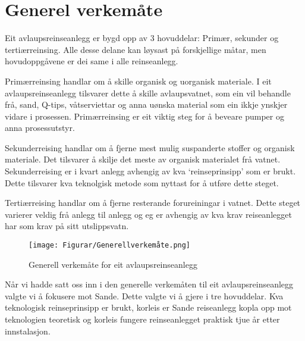 \section{Generel verkemåte}

Eit avlaupsreinseanlegg er bygd opp av 3 hovuddelar: Primær, sekunder og tertiærreinsing.
Alle desse delane kan løysast på forskjellige måtar, men hovudoppgåvene er dei same
i alle reinseanlegg.

Primærreinsing handlar om å skille organisk og uorganisk materiale.
I eit avlaupsreinseanlegg tilsvarer dette å skille avlaupsvatnet, 
som ein vil behandle frå, sand, Q-tips, våtserviettar
og anna uønska material som ein ikkje ynskjer vidare i prosessen. \newline
Primærreinsing er eit viktig steg for å beveare pumper og anna prosessutstyr.

Sekunderreising handlar om å fjerne mest mulig suspanderte stoffer og organisk materiale.
Det tilsvarer å skilje det meste av organisk materialet frå vatnet.
Sekunderreising er i kvart anlegg avhengig av kva `reinseprinsipp' som er brukt. Dette tilsvarer
kva teknolgisk metode som nyttast for å utføre dette steget.

Tertiærreising handlar om å fjerne resterande forureiningar i vatnet.
Dette steget varierer veldig frå anlegg til anlegg og eg er
avhengig av kva krav reiseanlegget har som krav på sitt utslippsvatn.

\begin{figure}[htbp]
    \centering
    \texttt{[image: Figurar/Generellverkemåte.png]}
    \caption{Generell verkemåte for eit avlaupsreinseanlegg}\label{fig:HMI}
\end{figure}

Når vi hadde satt oss inn i den generelle verkemåten til eit avlaupsreinseanlegg
valgte vi å fokusere mot Sande.
Dette valgte vi å gjere i tre hovuddelar. Kva teknologisk reinseprinsipp er brukt, korleis er Sande reiseanlegg
kopla opp mot teknologien teoretisk og korleis fungere reinseanlegget praktisk tjue år etter innstalasjon.